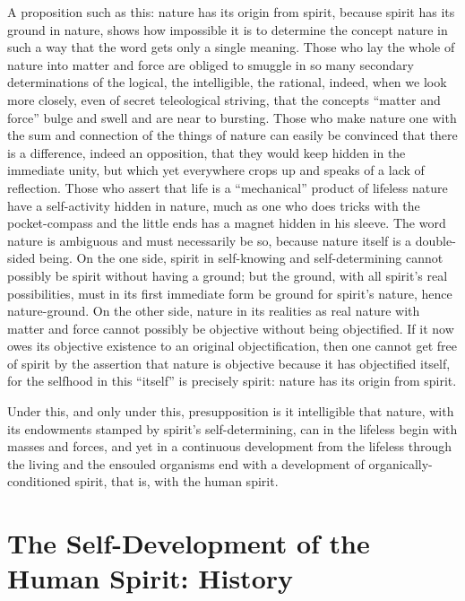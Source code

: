 \documentclass[12pt]{book}
\begin{document}
A proposition such as this: nature has its origin from spirit, because spirit has its ground in
nature, shows how impossible it is to determine the concept nature in such a way that the word gets
only a single meaning. Those who lay the whole of nature into matter and force are obliged to smuggle
in so many secondary determinations of the logical, the intelligible, the rational, indeed, when we
look more closely, even of secret teleological striving, that the concepts ``matter and force'' bulge
and swell and are near to bursting. Those who make nature one with the sum and connection of the
things of nature can easily be convinced that there is a difference, indeed an opposition, that they
would keep hidden in the immediate unity, but which yet everywhere crops up and speaks of a lack of
reflection. Those who assert that life is a ``mechanical'' product of lifeless nature have a
self-activity hidden in nature, much as one who does tricks with the pocket-compass and the little
ends has a magnet hidden in his sleeve. The word nature is ambiguous and must necessarily be so,
because nature itself is a double-sided being. On the one side, spirit in self-knowing and
self-determining cannot possibly be spirit without having a ground; but the ground, with all spirit's
real possibilities, must in its first immediate form be ground for spirit's nature, hence
nature-ground. On the other side, nature in its realities as real nature with matter and force cannot
possibly be objective without being objectified. If it now owes its objective existence to an original
objectification, then one cannot get free of spirit by the assertion that nature is objective because
it has objectified itself, for the selfhood in this ``itself'' is precisely spirit: nature has its
origin from spirit.

Under this, and only under this, presupposition is it intelligible that nature, with its endowments
stamped by spirit's self-determining, can in the lifeless begin with masses and forces, and yet in a
continuous development from the lifeless through the living and the ensouled organisms end with a
development of organically-conditioned spirit, that is, with the human spirit.

\section{The Self-Development of the Human Spirit: History}
\label{sec:22en}
\end{document}

